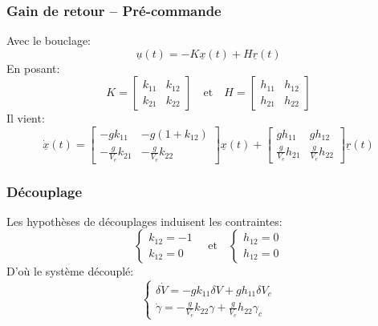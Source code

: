 \documentclass[tikz, footheight=2em]{beamer}
\begin{document}
\begin{frame}
    \frametitle{Gain de retour -- Pré-commande} \pause{}
    Avec le bouclage:
    \[
    \underline{u}(t) = -K \underline{x}(t) +
        H \underline{r}(t)
    \] \pause{}
    En posant:
    \[
    K =
    \left[
    \begin{array}{cc}
        k_{11} & k_{12} \\
        k_{21} & k_{22}
    \end{array}
    \right]\quad
    \text{et}\quad
    H =
    \left[
    \begin{array}{cc}
        h_{11} & h_{12} \\
        h_{21} & h_{22}
    \end{array}
    \right]
    \] \pause{}
    Il vient:
    \[
    \underline{\dot{x}}(t)
    =
    \left[
    \begin{array}{cc}
        -g k_{11} & -g (1+k_{12}) \\
        -\frac{g}{V_e} k_{21} & -\frac{g}{V_e} k_{22}
    \end{array}
    \right]
    \underline{x} (t)
    +
    \left[
    \begin{array}{cc}
        g h_{11} & g h_{12} \\
        \frac{g}{V_e} h_{21} & \frac{g}{V_e} h_{22}
    \end{array}
    \right]
    \underline{r} (t)
    \]
\end{frame}


\begin{frame}
    \frametitle{Découplage} \pause{}
    Les hypothèses de découplages induisent les contraintes:
    \[
    \left \{
    \begin{array}{l}
        k_{12} = -1 \\
        k_{12} = 0
    \end{array}
    \right.\quad
    \text{et}\quad
    \left \{
    \begin{array}{l}
        h_{12} = 0 \\
        h_{12} = 0
    \end{array}
    \right.
    \]
    \pause{}
    D'où le système découplé:
    \[
    \left \{
    \begin{array}{l}
        \delta \dot{V} = -g k_{11} \delta V + g h_{11} \delta V_c \\
        \dot{\gamma} = -\frac{g}{V_e} k_{22} \gamma + \frac{g}{V_e} h_{22} \gamma_c
    \end{array}
    \right.
    \]
\end{frame}
\end{document}
